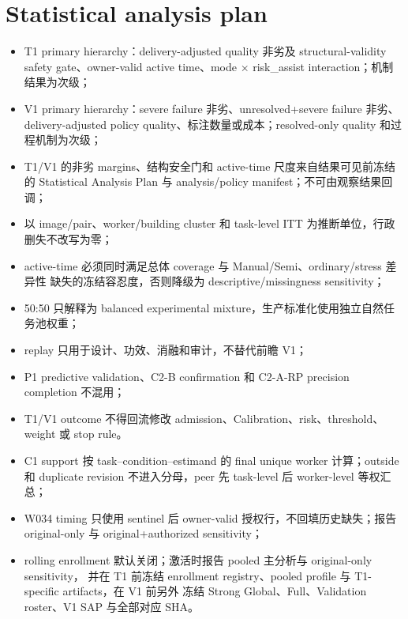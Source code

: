 \section{Statistical analysis plan}

\begin{itemize}
  \item T1 primary hierarchy：delivery-adjusted quality 非劣及 structural-validity safety
  gate、owner-valid active time、mode $\times$ risk\_assist interaction；机制结果为次级；
  \item V1 primary hierarchy：severe failure 非劣、unresolved+severe failure 非劣、
  delivery-adjusted policy quality、标注数量或成本；resolved-only quality 和过程机制为次级；
  \item T1/V1 的非劣 margins、结构安全门和 active-time 尺度来自结果可见前冻结的
  Statistical Analysis Plan 与 analysis/policy manifest；不可由观察结果回调；
  \item 以 image/pair、worker/building cluster 和 task-level ITT 为推断单位，行政删失不改写为零；
  \item active-time 必须同时满足总体 coverage 与 Manual/Semi、ordinary/stress 差异性
  缺失的冻结容忍度，否则降级为 descriptive/missingness sensitivity；
  \item 50:50 只解释为 balanced experimental mixture，生产标准化使用独立自然任务池权重；
  \item replay 只用于设计、功效、消融和审计，不替代前瞻 V1；
  \item P1 predictive validation、C2-B confirmation 和 C2-A-RP precision completion 不混用；
  \item T1/V1 outcome 不得回流修改 admission、Calibration、risk、threshold、weight 或 stop rule。
  \item C1 support 按 task--condition--estimand 的 final unique worker 计算；outside 和 duplicate
  revision 不进入分母，peer 先 task-level 后 worker-level 等权汇总；
  \item W034 timing 只使用 sentinel 后 owner-valid 授权行，不回填历史缺失；报告 original-only 与
  original+authorized sensitivity；
  \item rolling enrollment 默认关闭；激活时报告 pooled 主分析与 original-only sensitivity，
  并在 T1 前冻结 enrollment registry、pooled profile 与 T1-specific artifacts，在 V1 前另外
  冻结 Strong Global、Full、Validation roster、V1 SAP 与全部对应 SHA。
\end{itemize}
